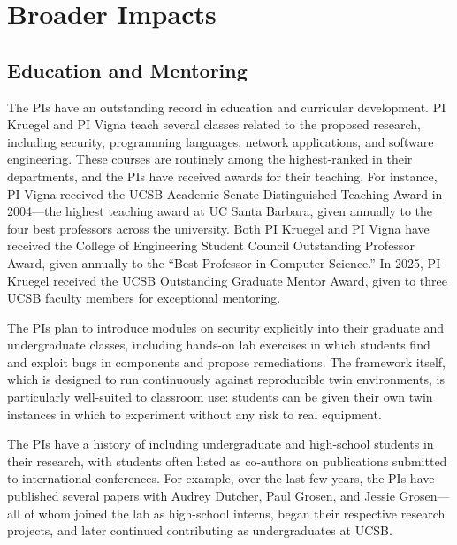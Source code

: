 \section{Broader Impacts}
\label{sec:broader}

\subsection{Education and Mentoring}

The PIs have an outstanding record in education and curricular
development. PI Kruegel and PI Vigna teach several classes related to
the proposed research, including security, programming languages,
network applications, and software engineering. These courses are
routinely among the highest-ranked in their departments, and the PIs
have received awards for their teaching. For instance, PI Vigna
received the UCSB Academic Senate Distinguished Teaching Award in
2004---the highest teaching award at UC Santa Barbara, given annually
to the four best professors across the university. Both PI Kruegel
and PI Vigna have received the College of Engineering Student Council
Outstanding Professor Award, given annually to the ``Best Professor in
Computer Science.'' In 2025, PI Kruegel received the UCSB Outstanding
Graduate Mentor Award, given to three UCSB faculty members for
exceptional mentoring.

The PIs plan to introduce modules on \cps security explicitly into
their graduate and undergraduate classes, including hands-on lab
exercises in which students find and exploit bugs in \cps components
and propose remediations. The \sysname framework itself, which is
designed to run continuously against reproducible twin environments,
is particularly well-suited to classroom use: students can be given
their own twin instances in which to experiment without any risk to
real equipment.

The PIs have a history of including undergraduate and high-school
students in their research, with students often listed as co-authors
on publications submitted to international conferences. For example,
over the last few years, the PIs have published several papers with
Audrey Dutcher, Paul Grosen, and Jessie Grosen---all of whom joined
the lab as high-school interns, began their respective research
projects, and later continued contributing as undergraduates at UCSB.

